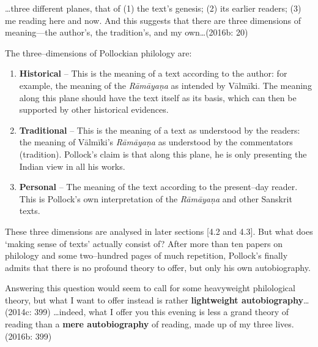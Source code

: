 \begin{myquote}
…three different planes, that of (1) the text’s genesis; (2) its earlier readers; (3) me reading here and now. And this suggests that there are three dimensions of meaning—the author’s, the tradition’s, and my own…(2016b: 20)
\end{myquote}

The three–dimensions of Pollockian philology are:

\vspace{-.2cm}

\begin{enumerate}
\itemsep=0pt
\item \textbf{Historical} – This is the meaning of a text according to the author: for example, the meaning of the \textit{Rāmāyaṇa} as intended by Vālmīki. The meaning along this plane should have the text itself as its basis, which can then be supported by other historical evidences.

 \item \textbf{Traditional} – This is the meaning of a text as understood by the readers: the meaning of Vālmīki’s \textit{Rāmāyaṇa} as understood by the commentators (tradition). Pollock’s claim is that along this plane, he is only presenting the Indian view in all his works.

 \item \textbf{Personal} – The meaning of the text according to the present–day reader. This is Pollock’s own interpretation of the \textit{Rāmāyaṇa} and other Sanskrit texts.

\end{enumerate}

\vspace{-.2cm}

These three dimensions are analysed in later sections [4.2 and 4.3]. But what does ‘making sense of texts’ actually consist of? After more than ten papers on philology and some two–hundred pages of much repetition, Pollock’s finally admits that there is no profound theory to offer, but only his own autobiography.

\begin{myquote}
Answering this question would seem to call for some heavyweight philological theory, but what I want to offer instead is rather \textbf{lightweight autobiography}… (2014c: 399) …indeed, what I offer you this evening is less a grand theory of reading than a \textbf{mere autobiography} of reading, made up of my three lives. (2016b: 399)
\end{myquote}

